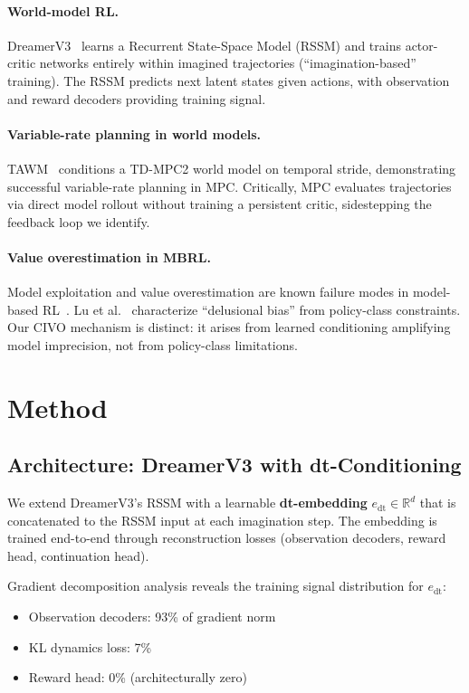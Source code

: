 \documentclass[10pt,letterpaper]{article}
\begin{document}
\paragraph{World-model RL.}
DreamerV3~\cite{hafner2023dreamerv3} learns a Recurrent State-Space Model (RSSM) and trains actor-critic networks entirely within imagined trajectories (``imagination-based'' training).
The RSSM predicts next latent states given actions, with observation and reward decoders providing training signal.

\paragraph{Variable-rate planning in world models.}
TAWM~\cite{nhu2025tawm} conditions a TD-MPC2 world model on temporal stride, demonstrating successful variable-rate planning in MPC.
Critically, MPC evaluates trajectories via direct model rollout without training a persistent critic, sidestepping the feedback loop we identify.

\paragraph{Value overestimation in MBRL.}
Model exploitation and value overestimation are known failure modes in model-based RL~\cite{janner2019mbpo}.
Lu et al.~\cite{lu2018nondelusional} characterize ``delusional bias'' from policy-class constraints.
Our CIVO mechanism is distinct: it arises from learned conditioning amplifying model imprecision, not from policy-class limitations.

\section{Method}

\subsection{Architecture: DreamerV3 with dt-Conditioning}

We extend DreamerV3's RSSM with a learnable \textbf{dt-embedding} $e_{\mathrm{dt}} \in \mathbb{R}^d$ that is concatenated to the RSSM input at each imagination step.
The embedding is trained end-to-end through reconstruction losses (observation decoders, reward head, continuation head).

Gradient decomposition analysis reveals the training signal distribution for $e_{\mathrm{dt}}$:
\begin{itemize}
    \item Observation decoders: 93\% of gradient norm
    \item KL dynamics loss: 7\%
    \item Reward head: 0\% (architecturally zero)
\end{itemize}
\end{document}
